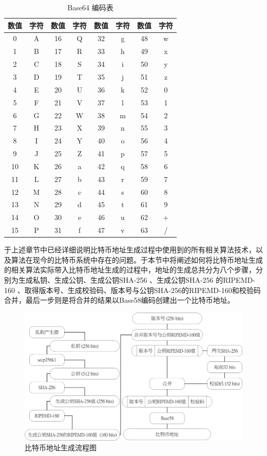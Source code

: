 					\begin{table}[!htbp]
					\centering
					\caption{Base64 编码表}
					\label{Base64}
					\begin{tabular}{|c|c|c|c|c|c|c|c|}
					\hline
					数值 & 字符 & 数值 & 字符 & 数值 & 字符 & 数值 & 字符 \\ \hline
					0 & A & 16 & Q & 32 & g & 48 & w \\ \hline
					1 & B & 17 & R & 33 & h & 49 & x \\ \hline
					2 & C & 18 & S & 34 & i & 50 & y \\ \hline
					3 & D & 19 & T & 35 & j & 51 & z \\ \hline
					4 & E & 20 & U & 36 & k & 52 & 0 \\ \hline
					5 & F & 21 & V & 37 & l & 53 & 1 \\ \hline
					6 & G & 22 & W & 38 & m & 54 & 2 \\ \hline
					7 & H & 23 & X & 39 & n & 55 & 3 \\ \hline
					8 & I & 24 & Y & 40 & o & 56 & 4 \\ \hline
					9 & J & 25 & Z & 41 & p & 57 & 5 \\ \hline
					10 & K & 26 & a & 42 & q & 58 & 6 \\ \hline
					11 & L & 27 & b & 43 & r & 59 & 7 \\ \hline
					12 & M & 28 & c & 44 & s & 60 & 8 \\ \hline
					13 & N & 29 & d & 45 & t & 61 & 9 \\ \hline
					14 & O & 30 & e & 46 & u & 62 & + \\ \hline
					15 & P & 31 & f & 47 & v & 63 & / \\ \hline
					\end{tabular}
					\end{table}
			于上述章节中已经详细说明⽐特币地址⽣成过程中使⽤到的所有相关算法技术，以及算法在现今的⽐特币系统中存在的问题。于本节中将阐述如何将比特币地址生成的相关算法实际带入比特币地址生成的过程中，地址的生成总共分为八个步骤，分别为生成私钥、生成公钥、生成公钥SHA-256 、生成公钥SHA-256 的RIPEMD-160 、取得版本号、生成校验码、版本号与公钥SHA-256的RIPEMD-160和校验码合并，最后一步则是将合并的结果以Base58编码创建出一个比特币地址。

			\begin{figure}[!htbp]
					\centering
					\includegraphics[width = .9\textwidth]{address.jpg}
					\caption{比特币地址生成流程图}\label{address}
			\end{figure}

